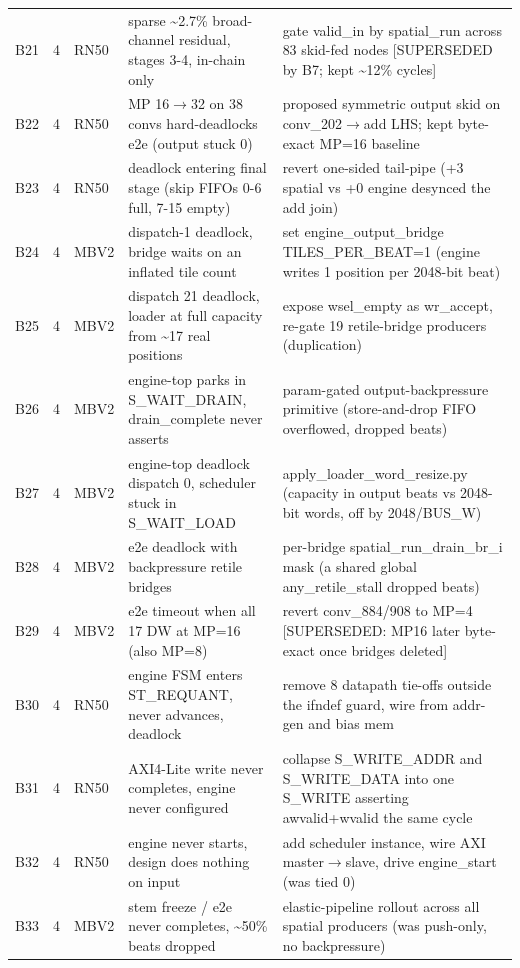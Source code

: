 \begin{footnotesize}
\begin{longtable}{@{}l l l p{} p{}@{}}
B21 & 4 & RN50 & sparse \textasciitilde{}2.7\% broad-channel residual, stages 3-4, in-chain only & gate valid\_in by spatial\_run across 83 skid-fed nodes [SUPERSEDED by B7; kept \textasciitilde{}12\% cycles] \\
B22 & 4 & RN50 & MP 16$\rightarrow$32 on 38 convs hard-deadlocks e2e (output stuck 0) & proposed symmetric output skid on conv\_202$\rightarrow$add LHS; kept byte-exact MP=16 baseline \\
B23 & 4 & RN50 & deadlock entering final stage (skip FIFOs 0-6 full, 7-15 empty) & revert one-sided tail-pipe (+3 spatial vs +0 engine desynced the add join) \\
B24 & 4 & MBV2 & dispatch-1 deadlock, bridge waits on an inflated tile count & set engine\_output\_bridge TILES\_PER\_BEAT=1 (engine writes 1 position per 2048-bit beat) \\
B25 & 4 & MBV2 & dispatch 21 deadlock, loader at full capacity from \textasciitilde{}17 real positions & expose wsel\_empty as wr\_accept, re-gate 19 retile-bridge producers (duplication) \\
B26 & 4 & MBV2 & engine-top parks in S\_WAIT\_DRAIN, drain\_complete never asserts & param-gated output-backpressure primitive (store-and-drop FIFO overflowed, dropped beats) \\
B27 & 4 & MBV2 & engine-top deadlock dispatch 0, scheduler stuck in S\_WAIT\_LOAD & apply\_loader\_word\_resize.py (capacity in output beats vs 2048-bit words, off by 2048/BUS\_W) \\
B28 & 4 & MBV2 & e2e deadlock with backpressure retile bridges & per-bridge spatial\_run\_drain\_br\_i mask (a shared global any\_retile\_stall dropped beats) \\
B29 & 4 & MBV2 & e2e timeout when all 17 DW at MP=16 (also MP=8) & revert conv\_884/908 to MP=4 [SUPERSEDED: MP16 later byte-exact once bridges deleted] \\
B30 & 4 & RN50 & engine FSM enters ST\_REQUANT, never advances, deadlock & remove 8 datapath tie-offs outside the ifndef guard, wire from addr-gen and bias mem \\
B31 & 4 & RN50 & AXI4-Lite write never completes, engine never configured & collapse S\_WRITE\_ADDR and S\_WRITE\_DATA into one S\_WRITE asserting awvalid+wvalid the same cycle \\
B32 & 4 & RN50 & engine never starts, design does nothing on input & add scheduler instance, wire AXI master$\rightarrow$slave, drive engine\_start (was tied 0) \\
B33 & 4 & MBV2 & stem freeze / e2e never completes, \textasciitilde{}50\% beats dropped & elastic-pipeline rollout across all spatial producers (was push-only, no backpressure) \\

\end{longtable}
\end{footnotesize}
